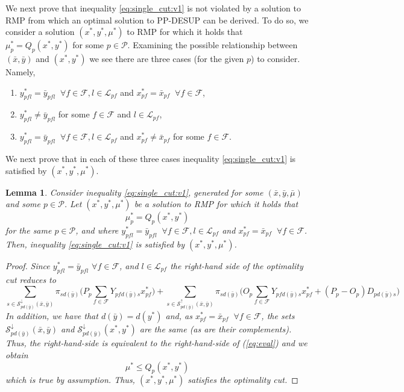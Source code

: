 \documentclass[12pt]{article}
\newtheorem{lemma}[theorem]{Lemma}%
\theoremstyle{thmstylethree}%
\newcommand{\mtc}[1] {\mathcal{#1}}
\begin{document}
We next prove that inequality \eqref{eq:single_cut:v1} is not violated by a solution to RMP from which an optimal solution to PP-DESUP can be derived. To do so, we consider a solution $(x^*,y^*,\mu^*)$ to RMP for which it holds that $\mu^*_p = Q_{p}(x^*,y^*)$ for some $p \in \mtc{P}.$  Examining the possible relationship between $(\bar{x},\bar{y})$ and $(x^*,y^*)$ we see there are three cases (for the given $p$) to consider. Namely,
\begin{enumerate}
    \item $y_{pfl}^* = \bar{y}_{pfl} \;\; \forall f \in \mathcal{F}, l \in \mathcal{L}_{pf}$ and $x_{pf}^{*} = \bar{x}_{pf} \;\; \forall f \in \mathcal{F}$,    
    \item $y_{pfl}^* \neq \bar{y}_{pfl}$ for some  $f \in \mathcal{F}$ and $l \in \mathcal{L}_{pf}$,
    \item $y_{pfl}^* = \bar{y}_{pfl} \;\; \forall f \in \mathcal{F}, l \in \mathcal{L}_{pf}$ and $x_{pf}^*\neq \bar{x}_{pf}$ for some $f \in \mathcal{F}$.
\end{enumerate}
We next prove that in each of these three cases inequality \eqref{eq:single_cut:v1} is satisfied by $(x^*,y^*,\mu^*)$.

\begin{lemma}
  \label{lem:valid_cut_case_1}
  Consider inequality \eqref{eq:single_cut:v1}, generated for some $(\bar{x},\bar{y},\bar{\mu})$ and some $p\in\mathcal{P}$.
  Let $(x^*,y^*,\mu^*)$ be a solution to RMP for which it holds that
  $$\mu^*_p = Q_{p}(x^*,y^*)$$
  for the same $p\in\mtc{P}$, and where $y_{pfl}^* = \bar{y}_{pfl} \;\; \forall f \in \mathcal{F}, l \in \mathcal{L}_{pf}$ and $x_{pf}^{*} = \bar{x}_{pf} \;\; \forall f \in \mathcal{F}$.    
  Then, inequality \eqref{eq:single_cut:v1} is satisfied by $(x^*,y^*,\mu^*)$.
\end{lemma}
\begin{proof}
  \itshape
Since $y_{pfl}^* = \bar{y}_{pfl}$  $\forall f \in \mathcal{F}$, and $l \in \mathcal{L}_{pf}$ the right-hand side of the optimality cut reduces to 
$$\sum_{s \in \mathcal{S}^{\downarrow}_{pd(\bar{y})}(\bar{x},\bar{y})} \pi_{sd(\bar{y})} \bigg(P_p \sum_{f \in \mathcal{F}}Y_{pfd(\bar{y})s}x^{*}_{pf} \bigg)  +\sum_{s \in \mathcal{S}^{\uparrow}_{pd(\bar{y})}(\bar{x},\bar{y})} \pi_{sd(\bar{y})}\bigg(O_p\sum_{f\in\mathcal{F}}Y_{pfd(\bar{y})s}x^{*}_{pf}+(P_p-O_p)D_{pd(\bar{y})s}\bigg)$$ 
In addition, we have that $d(\bar{y}) = d(y^{*})$ and, as $x_{pf}^{*} = \bar{x}_{pf} \;\; \forall f \in \mathcal{F}$, the sets $\mathcal{S}^{\downarrow}_{pd(\bar{y})}(\bar{x},\bar{y})$ and $\mathcal{S}^{\downarrow}_{pd(\bar{y})}(x^*,y^*)$ are the same (as are their complements). Thus, the right-hand-side is equivalent to the right-hand-side of (\ref{eq:eval}) and we obtain 
$$\mu^*\leq  Q_{p}(x^*,y^*)$$
which is true by assumption. Thus, $(x^*,y^*,\mu^*)$ satisfies the optimality cut.
\end{proof}
\end{document}
